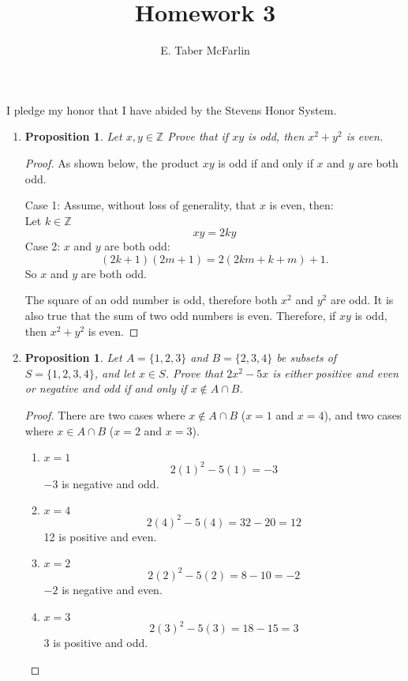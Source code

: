 \documentclass[12pt,a4paper,reqno,parskip=full]{amsart}
\numberwithin{equation}{section}
\theoremstyle{plain}
\newtheorem{proposition}[subsection]{Proposition}
\theoremstyle{definition}
\begin{document}
\title{Homework 3}

\author{E. Taber McFarlin}

\maketitle

I pledge my honor that I have abided by the Stevens Honor System.

\renewcommand{\labelenumii}{\roman{enumii}}
\begin{enumerate}
  \item
        \begin{proposition}
          Let $x, y \in \mathbb{Z}$ Prove that if $xy$ is odd, then $x^2 + y^2$ is even.
        \end{proposition}

        \begin{proof}
          As shown below, the product $xy$ is odd if and only if $x$ and $y$ are both odd.

          Case 1: Assume, without loss of generality, that $x$ is even, then: \\
          Let $k\in\mathbb{Z}$
          \[xy = 2ky\]
          Case 2: $x$ and $y$ are both odd:
          \[(2k + 1)(2m + 1) = 2(2km + k + m) + 1.\]
          So $x$ and $y$ are both odd.

          The square of an odd number is odd, therefore both $x^2$ and $y^2$ are odd. It is also true that the sum of two odd numbers is even. Therefore, if $xy$ is odd, then $x^2 + y^2$ is even.
        \end{proof}

  \item
        \begin{proposition}
          Let $A=\{1,2,3\}$ and $B=\{2,3,4\}$ be subsets of $S=\{1,2,3,4\}$, and let $x\in S$.
          Prove that $2x^2-5x$ is either positive and even or negative and odd
          if and only if $x\not\in A\cap B$.
        \end{proposition}
        \begin{proof}
          There are two cases where $x \notin A\cap B$ ($x=1$ and $x=4$),
          and two cases where $x \in A\cap B$ ($x=2$ and $x=3$).

          \begin{enumerate}
            \item $x = 1$
                  \[2(1)^2 - 5(1) = -3\]
                  $-3$ is negative and odd.
            \item $x = 4$
                  \[2(4)^2 - 5(4) = 32 - 20 = 12\]
                  12 is positive and even.
            \item $x = 2$
                  \[2(2)^2 - 5(2) = 8 - 10 = -2\]
                  $-2$ is negative and even.
            \item $x = 3$
                  \[2(3)^2 - 5(3) = 18 - 15 = 3\]
                  3 is positive and odd.
          \end{enumerate}


\end{proof}
\end{enumerate}
\end{document}
